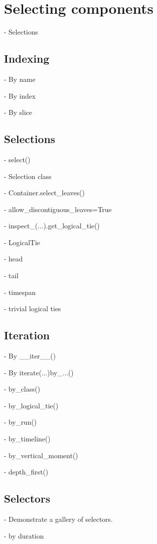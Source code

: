 \section{Selecting components}

-   Selections

\subsection{Indexing}

-   By name

-   By index

-   By slice

\subsection{Selections}

-   select()

-   Selection class

-   Container.select\_leaves()

    -   allow\_discontiguous\_leaves=True

-   inspect\_(...).get\_logical\_tie()

-   LogicalTie

    -   head

    -   tail

    -   timespan

    -   trivial logical ties

\subsection{Iteration}

-   By \_\_iter\_\_()

-   By iterate(...)by\_...()

    -   by\_class()

    -   by\_logical\_tie()

    -   by\_run()

    -   by\_timeline()

    -   by\_vertical\_moment()

    -   depth\_first()

\subsection{Selectors}

-   Demonstrate a gallery of selectors.

    -   by duration

